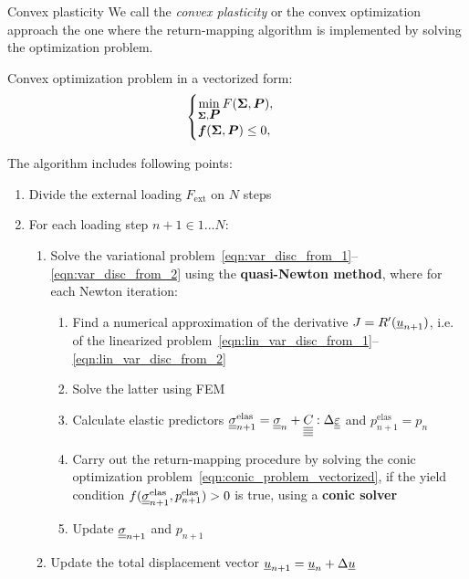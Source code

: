 \documentclass[9pt]{beamer}
\begin{document}
\begin{frame}{Convex plasticity}
  We call the \textit{convex plasticity} or the convex optimization approach the one where the return-mapping algorithm is implemented by solving the optimization problem.
  \newline 

  Convex optimization problem in a vectorized form:
  \begin{equation}
    \label{eqn:conic_problem_vectorized}
    \begin{cases}
        \min\limits_{\bm{\Sigma}, \mbox{\boldmath $P$}} F(\bm{\Sigma}, \mbox{\boldmath $P$}), \\
        \mbox{\boldmath $f$}(\bm{\Sigma}, \mbox{\boldmath $P$}) \leq 0,
    \end{cases}
  \end{equation}

  The algorithm includes following points:
  \begin{enumerate}
    \item Divide the external loading $F_\text{ext}$ on $N$ steps
    \item For each loading step $n+1 \in {1 \dots N}$:
    \begin{enumerate}
        \item Solve the variational problem~\eqref{eqn:var_disc_from_1}--\eqref{eqn:var_disc_from_2} using the \textbf{quasi-Newton method}, where for each Newton iteration:
        \begin{enumerate}
            \item Find a numerical approximation of the derivative $J = R^\prime(\underline{u}_{n+1})$, i.e. of the linearized problem~\eqref{eqn:lin_var_disc_from_1}--\eqref{eqn:lin_var_disc_from_2}
            \item Solve the latter using FEM
            \item Calculate elastic predictors $\underline{\underline{\sigma}}_{n+1}^{\text{elas}} = \underline{\underline{\sigma}}_n + \underline{\underline{\underline{\underline{C_{}}}}} : \Delta\underline{\underline{\varepsilon}}$ and $p^\text{elas}_{n+1} = p_n$
            \item Carry out the return-mapping procedure by solving the conic optimization problem~\eqref{eqn:conic_problem_vectorized}, if the yield condition $f(\underline{\underline{\sigma}}_{n+1}^{\text{elas}}, p^\text{elas}_{n+1}) > 0$ is true, using a \textbf{conic solver}
            \item Update $\underline{\underline{\sigma}}_{n+1}$ and $p_{n+1}$
        \end{enumerate}
        \item Update the total displacement vector $\underline{u}_{n+1} = \underline{u}_n + \Delta\underline{u}$
    \end{enumerate}
  \end{enumerate}
\end{frame}
\end{document}
